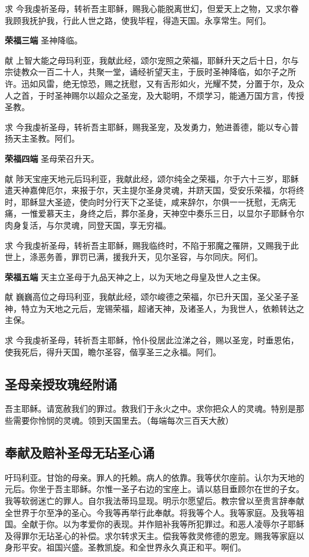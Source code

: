 \documentclass[UTF8,17pt]{ctexart}
\begin{document}
求 \quad 今我虔祈圣母，转祈吾主耶稣，赐我心能脱离世幻，但爱天上之物，又求尔眷我顾我抚护我，行此人世之路，使我毕程，得造天国。永享常生。阿们。

\textbf{荣福三端} \quad 圣神降临。

献 \quad 上智大能之母玛利亚，我献此经，颂尔宠照之荣福，耶稣升天之后十日，尔与宗徒教众一百二十人，共聚一堂，诵经祈望天主，于辰时圣神降临，如尔子之所许。迅如风雷，绝无惊恐，赐之抚慰，又有舌形如火，光耀不焚，分置于尔，及众人之首，于时圣神赐尔以超众之圣宠，及大聪明，不烦学习，能通万国方言，传授圣教。

求 \quad 今我虔祈圣母，转祈吾主耶稣，赐我圣宠，及发勇力，勉进善德，能以专心普扬天主圣教。阿们。

\textbf{荣福四端} \quad 圣母荣召升天。

献 \quad 陟天宝座天地元后玛利亚，我献此经，颂尔纯全之荣福，尔于六十三岁，耶稣遣天神嘉俾厄尔，来报于尔，天主提尔圣身灵魂，并跻天国，受安乐荣福，尔将终时，耶稣显大圣迹，使向时分行天下之圣徒，咸来辞尔，尔俱一一抚慰，无病无痛，一惟爱慕天主，身终之后，葬尔圣身，天神空中奏乐三日，以显尔子耶稣令尔肉身复活，与尔灵魂，同登天国，享无穷福。

求 \quad 今我虔祈圣母，转祈吾主耶稣，赐我临终时，不陷于邪魔之罹阱，又赐我于此世上，涤恶务善，罪罚已满，援我升天，见尔圣容，与尔同庆。阿们。

\textbf{荣福五端} \quad 天主立圣母于九品天神之上，以为天地之母皇及世人之主保。

献 \quad 巍巍高位之母玛利亚，我献此经，颂尔峻德之荣福，尔已升天国，圣父圣子圣神，特立为天地之元后，宠锡荣福，超诸天神，及诸圣人，为我世人，依赖转达之主保。

求 \quad 今我虔祈圣母，转祈吾主耶稣，怜仆役居此泣涕之谷，赐以圣宠，时垂恩佑，使我死后，得升天国，瞻尔圣容，偕享圣三之永福。阿们。

\subsection{圣母亲授玫瑰经附诵}

吾主耶稣。请宽赦我们的罪过。救我们于永⽕之中。求你把众⼈的灵魂。特别是那些需要你怜悯的灵魂。领到天国⾥去。（每端每次三百天⼤赦）

\subsection{奉献及赔补圣母⽆玷圣⼼诵}

吁玛利亚。⽢饴的母亲。罪⼈的托赖。病⼈的依靠。我等伏尔座前。认尔为天地的元后。你坐于吾主耶稣。尔惟⼀圣⼦右边的宝座上。请以慈⽬垂顾尔在世的⼦⼥。我等软弱迷亡的罪⼈。⾃尔我法蒂玛显现。明⽰尔愿望后。教宗曾以⾄贵⾔辞奉献全世界于尔⾄净的圣⼼。今我等再举⾏此奉献。将我等个⼈。我等家庭。及我等祖国。全献于你。以为孝爱你的表现。并作赔补我等所犯罪过。和恶⼈凌辱尔⼦耶稣及得罪尔⽆玷圣⼼的补偿。求尔转求天主。偿我等救灵修德的恩宠。赐我等家庭以⾝形平安。祖国兴盛。圣教凯旋。和全世界永久真正和平。啊们。
\end{document}
